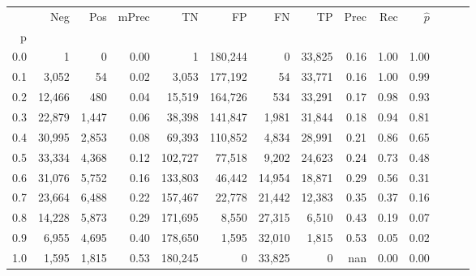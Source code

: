 \begin{tabular}{rrrrrrrrrrrrrr}
\toprule
{} &     Neg &    Pos & mPrec &       TN &       FP &      FN &      TP &  Prec &   Rec & $\hat{p}$ \\
p   &         &        &       &          &          &         &         &       &       &           \\
\midrule
0.0 &       1 &      0 &  0.00 &        1 &  180,244 &       0 &  33,825 &  0.16 &  1.00 &      1.00 \\
0.1 &   3,052 &     54 &  0.02 &    3,053 &  177,192 &      54 &  33,771 &  0.16 &  1.00 &      0.99 \\
0.2 &  12,466 &    480 &  0.04 &   15,519 &  164,726 &     534 &  33,291 &  0.17 &  0.98 &      0.93 \\
0.3 &  22,879 &  1,447 &  0.06 &   38,398 &  141,847 &   1,981 &  31,844 &  0.18 &  0.94 &      0.81 \\
0.4 &  30,995 &  2,853 &  0.08 &   69,393 &  110,852 &   4,834 &  28,991 &  0.21 &  0.86 &      0.65 \\
0.5 &  33,334 &  4,368 &  0.12 &  102,727 &   77,518 &   9,202 &  24,623 &  0.24 &  0.73 &      0.48 \\
0.6 &  31,076 &  5,752 &  0.16 &  133,803 &   46,442 &  14,954 &  18,871 &  0.29 &  0.56 &      0.31 \\
0.7 &  23,664 &  6,488 &  0.22 &  157,467 &   22,778 &  21,442 &  12,383 &  0.35 &  0.37 &      0.16 \\
0.8 &  14,228 &  5,873 &  0.29 &  171,695 &    8,550 &  27,315 &   6,510 &  0.43 &  0.19 &      0.07 \\
0.9 &   6,955 &  4,695 &  0.40 &  178,650 &    1,595 &  32,010 &   1,815 &  0.53 &  0.05 &      0.02 \\
1.0 &   1,595 &  1,815 &  0.53 &  180,245 &        0 &  33,825 &       0 &   nan &  0.00 &      0.00 \\
\bottomrule
\end{tabular}
